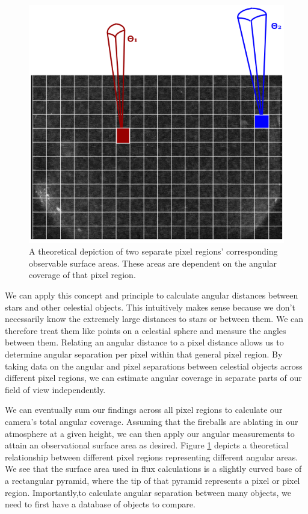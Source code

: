\begin{figure}[ht!]
  \centering
  \includegraphics[scale=0.53]{images/angdistances_explained.png}
  \caption{A theoretical depiction of two separate pixel regions' corresponding observable surface areas.  These areas are dependent on the angular coverage of that pixel region.}
  \label{angdist_exp}
\end{figure}


We can apply this concept and principle to calculate angular distances between stars and other celestial objects.
This intuitively makes sense because we don't necessarily know the extremely large distances to stars or between them.
We can therefore treat them like points on a celestial sphere and measure the angles between them.
Relating an angular distance to a pixel distance allows us to determine angular separation per pixel within that general pixel region.
By taking data on the angular and pixel separations between celestial objects across different pixel regions, we can estimate angular coverage in separate parts of our field of view independently.

We can eventually sum our findings across all pixel regions to calculate our camera's total angular coverage.  
Assuming that the fireballs are ablating in our atmosphere at a given height, we can then apply our angular measurements to attain an observational surface area as desired.
Figure \ref{angdist_exp} depicts a theoretical relationship between different pixel regions representing different angular areas.
We see that the surface area used in flux calculations is a slightly curved base of a rectangular pyramid, where the tip of that pyramid represents a pixel or pixel region.
Importantly,to calculate angular separation between many objects, we need to first have a database of objects to compare.


